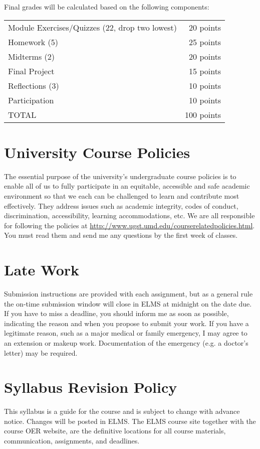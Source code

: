 \documentclass[11pt]{article}
\begin{document}
Final grades will be calculated based on the following components:

\hspace*{.5in}
\begin{tabular}{lr}
	Module Exercises/Quizzes (22, drop two lowest) & 20 points \\
	Homework (5) & 25 points \\
	Midterms (2) & 20 points \\
	Final Project & 15 points \\
	Reflections (3) & 10 points \\
	Participation & 10 points \\
	\hline
	TOTAL & 100 points \\
\end{tabular}

\section{University Course Policies}
The essential purpose of the university’s undergraduate course policies is to enable all of us to fully participate in an equitable, accessible and safe academic environment so that we each can be challenged to learn and contribute most effectively. They address issues such as academic integrity, codes of conduct, discrimination, accessibility, learning accommodations, etc. We are all responsible for following the policies at \href{http://www.ugst.umd.edu/courserelatedpolicies.html}{http://www.ugst.umd.edu/courserelatedpolicies.html}. You must read them and send me any questions by the first week of classes.

\section{Late Work}
Submission instructions are provided with each assignment, but as a general rule the on-time submission window will close in ELMS at midnight on the date due.  If you have to miss a deadline, you should inform me as soon as possible, indicating the reason and when you propose to submit your work. If you have a legitimate reason, such as a major medical or family emergency, I may agree to an extension or makeup work. Documentation of the emergency (e.g. a doctor's letter) may be required.

\section{Syllabus Revision Policy}
This syllabus is a guide for the course and is subject to change with advance notice. Changes will be posted in ELMS. The ELMS course site together with the course OER website, are the definitive locations for all course materials, communication, assignments, and deadlines.
\end{document}
